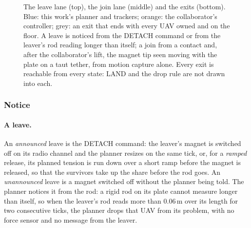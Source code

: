 \begin{figure}[htbp]
\caption[Leave and join lanes and their exits]{The leave lane (top), the join lane (middle) and the exits
(bottom). Blue: this work's planner and trackers; orange: the collaborator's controller; grey: an exit that ends
with every UAV owned and on the floor. A leave is noticed from the DETACH command or from the leaver's rod reading
longer than itself; a join from a contact and, after the collaborator's lift, the magnet tip seen moving with the
plate on a taut tether, from motion capture alone. Every exit is reachable from every state: LAND and the drop rule
are not drawn into each.}
\label{fig:reconfig_states}
\end{figure}

\subsubsection{Notice}

\paragraph{A leave.} An \emph{announced} leave is the DETACH command: the leaver's magnet is switched off on its
radio channel and the planner resizes on the same tick, or, for a \emph{ramped} release, its planned tension is run
down over a short ramp before the magnet is released, so that the survivors take up the share before the rod goes.
An \emph{unannounced} leave is a magnet switched off without the planner being told. The planner notices it from the
rod: a rigid rod on its plate cannot measure longer than itself, so when the leaver's rod reads more than 0.06\,m over
its length for two consecutive ticks, the planner drops that UAV from its problem, with no force sensor and no message
from the leaver.

